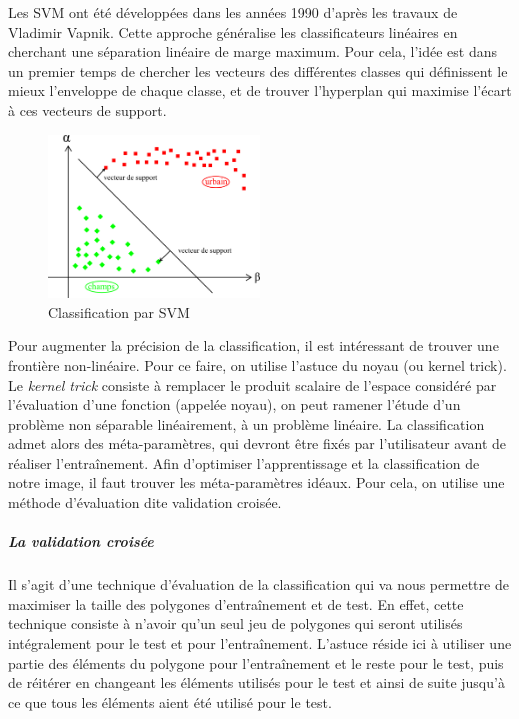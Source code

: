 \documentclass[a4paper,10pt]{article}
\begin{document}
Les SVM ont été développées dans les années 1990 d'après les travaux de Vladimir Vapnik. Cette approche généralise les classificateurs linéaires en cherchant une séparation linéaire de marge maximum. Pour cela, l'idée est dans un premier temps de chercher les vecteurs des différentes classes qui définissent le mieux l'enveloppe de chaque classe, et de trouver l'hyperplan qui maximise l'écart à ces vecteurs de support.

\begin{figure}[H]
  \centering
    \includegraphics[width=0.5\textwidth]{ml_svm}
  \caption{Classification par SVM}
  \label{fig:ml_svm}
\end{figure}

Pour augmenter la précision de la classification, il est intéressant de trouver une frontière non-linéaire. Pour ce faire, on utilise l'astuce du noyau (ou kernel trick). Le \textit{kernel trick}\cite{aizermanSVM} consiste à remplacer le produit scalaire de l'espace considéré par l'évaluation d'une fonction (appelée noyau), on peut ramener l'étude d'un problème non séparable linéairement, à un problème linéaire. La classification admet alors des méta-paramètres, qui devront être fixés par l'utilisateur avant de réaliser l'entraînement. Afin d'optimiser l'apprentissage et la classification de notre image, il faut trouver les méta-paramètres idéaux. Pour cela, on utilise une méthode d'évaluation dite validation croisée.

\subparagraph{La validation croisée\newline}
Il s'agit d'une technique d'évaluation de la classification qui va nous permettre de maximiser la taille des polygones d'entraînement et de test. En effet, cette technique consiste à n'avoir qu'un seul jeu de polygones qui seront utilisés intégralement pour le test et pour l'entraînement. L'astuce réside ici à utiliser une partie des éléments du polygone pour l'entraînement et le reste pour le test, puis de réitérer en changeant les éléments utilisés pour le test et ainsi de suite jusqu'à ce que tous les éléments aient été utilisé pour le test.

\end{document}
